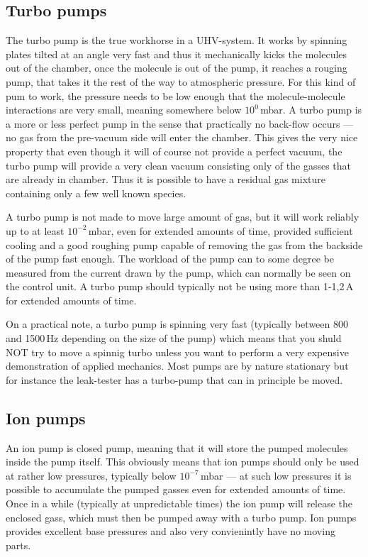 \documentclass[a4paper,english]{article}
\begin{document}
\subsection{Turbo pumps}
The turbo pump is the true workhorse in a UHV-system. It works by spinning plates tilted at an angle very fast and thus it mechanically kicks the molecules out of the chamber, once the molecule is out of the pump, it reaches a rouging pump, that takes it the rest of the way to atmospheric pressure. For this kind of pum to work, the pressure needs to be low enough that the molecule-molecule interactions are very small, meaning somewhere below $10^{0}$\,mbar. A turbo pump is a more or less perfect pump in the sense that practically no back-flow occurs --- no gas from the pre-vacuum side will enter the chamber. This gives the very nice property that even though it will of course not provide a perfect vacuum, the turbo pump will provide a very clean vacuum consisting only of the gasses that are already in chamber. Thus it is possible to have a residual gas mixture containing only a few well known species.

A turbo pump is not made to move large amount of gas, but it will work reliably up to at least $10^{-2}$\,mbar, even for extended amounts of time, provided sufficient cooling and a good roughing pump capable of removing the gas from the backside of the pump fast enough. The workload of the pump can to some degree be measured from the current drawn by the pump, which can normally be seen on the control unit. A turbo pump should typically not be using more than 1-1,2\,A for extended amounts of time.

On a practical note, a turbo pump is spinning very fast (typically between 800 and 1500\,Hz depending on the size of the pump) which means that you shuld NOT try to move a spinnig turbo unless you want to perform a very expensive demonstration of applied mechanics. Most pumps are by nature stationary but for instance the leak-tester has a turbo-pump that can in principle be moved.

\subsection{Ion pumps}
An ion pump is closed pump, meaning that it will store the pumped molecules inside the pump itself. This obviously means that ion pumps should only be used at rather low pressures, typically below $10^{-7}$\,mbar --- at such low pressures it is possible to accumulate the pumped gasses even for extended amounts of time. Once in a while (typically at unpredictable times) the ion pump will release the enclosed gass, which must then be pumped away with a turbo pump. Ion pumps provides excellent base pressures and also very convienintly have no moving parts.
\end{document}

